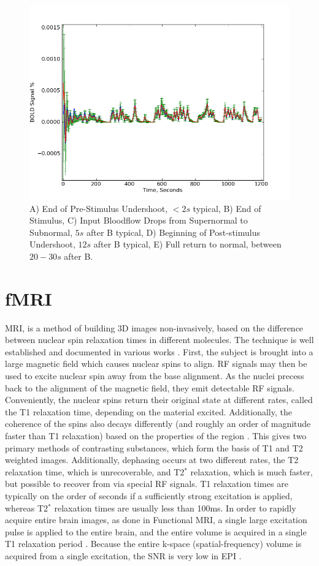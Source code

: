 \begin{figure}
\centering
\includegraphics[width=.5\textwidth]{images/bold}
\caption[Diagram of BOLD Signal]{A) End of Pre-Stimulus Undershoot, $< 2s$ typical,
B) End of Stimulus, C) Input Bloodflow Drops from Supernormal to Subnormal,
$5 s$ after B typical, D) Beginning of Post-stimulus Undershoot, $12 s$ after B
typical, E) Full return to normal, between $20-30s$ after B. \cite{Behzadi2005}}
\end{figure}

\section{\ac{fMRI}}
\ac{MRI}, is a method of building 3D images
non-invasively, based on the difference between nuclear spin
relaxation times in different molecules. The technique is
well established and documented in various works \cite{Bushberg2002}. 
First, the subject 
is brought into a large magnetic field which causes nuclear spins
to align. \ac{RF} signals may
then be used to excite nuclear spin away from the base alignment. 
As the nuclei precess back to the alignment of the magnetic
field, they emit detectable \ac{RF} signals. Conveniently, the
nuclear spins return their original state at different
rates, called the \ac{T1} relaxation time, depending on the material excited.
Additionally, the
coherence of the spins also decays differently (and roughly an order of 
magnitude faster
than \ac{T1} relaxation) based on the properties of the region 
\cite{Bushberg2002}.
This gives two primary methods of contrasting substances,
which form the basis of \ac{T1} and \ac{T2} weighted images. Additionally, 
dephasing occurs at two different rates, the \ac{T2} relaxation time,
which is unrecoverable, and \ac{T2}$^*$ relaxation, which is
much faster, but possible to recover from via special \ac{RF} signals.
\ac{T1} relaxation times are typically on the order of seconds if 
a sufficiently strong excitation is applied, whereas \ac{T2}$^*$ relaxation
times are usually less than 100ms. 
In order to rapidly acquire entire brain images, as done in Functional 
\ac{MRI}, a single large excitation pulse is applied to the entire brain,
and the entire volume is acquired in a single \ac{T1} relaxation period
\cite{Obata2004}. 
Because the entire k-space (spatial-frequency) volume is acquired 
from a single excitation, the \ac{SNR} is very low
in \ac{EPI} \cite{Smith2007}. 

